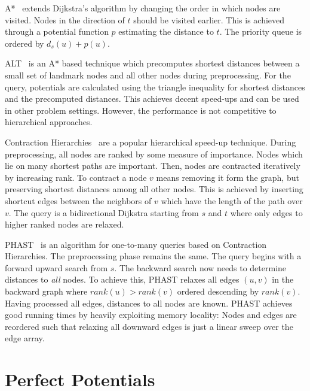 \documentclass[a4paper,UKenglish,cleveref, autoref]{lipics-v2019}
\begin{document}
A*~\cite{hnr-afbhd-68} extends Dijkstra's algorithm by changing the order in which nodes are visited.
Nodes in the direction of $t$ should be visited earlier.
This is achieved through a potential function $p$ estimating the distance to $t$.
The priority queue is ordered by $d_s(u) + p(u)$.

ALT~\cite{gh-cspas-05} is an A* based technique which precomputes shortest distances between a small set of landmark nodes and all other nodes during preprocessing.
For the query, potentials are calculated using the triangle inequality for shortest distances and the precomputed distances.
This achieves decent speed-ups and can be used in other problem settings.
However, the performance is not competitive to hierarchical approaches.

Contraction Hierarchies~\cite{gssv-erlrn-12} are a popular hierarchical speed-up technique.
During preprocessing, all nodes are ranked by some measure of importance.
Nodes which lie on many shortest paths are important.
Then, nodes are contracted iteratively by increasing rank.
To contract a node $v$ means removing it form the graph, but preserving shortest distances among all other nodes.
This is achieved by inserting shortcut edges between the neighbors of $v$ which have the length of the path over $v$.
The query is a bidirectional Dijkstra starting from $s$ and $t$ where only edges to higher ranked nodes are relaxed.

PHAST~\cite{dgnw-phast-13} is an algorithm for one-to-many queries based on Contraction Hierarchies.
The preprocessing phase remains the same.
The query begins with a forward upward search from $s$.
The backward search now needs to determine distances to \emph{all} nodes.
To achieve this, PHAST relaxes all edges $(u,v)$ in the backward graph where $rank(u) > rank(v)$ ordered descending by $rank(v)$.
Having processed all edges, distances to all nodes are known.
PHAST achieves good running times by heavily exploiting memory locality:
Nodes and edges are reordered such that relaxing all downward edges is just a linear sweep over the edge array.


\section{Perfect Potentials}
\label{sec:algo}
\end{document}
